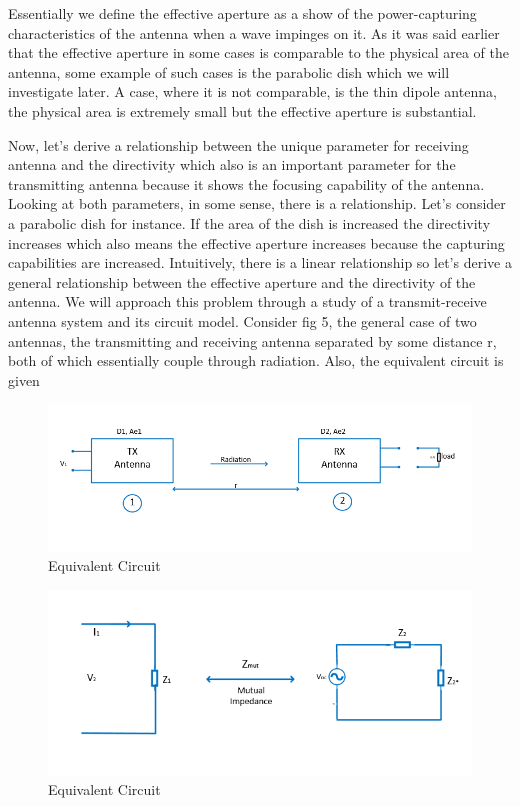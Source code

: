 Essentially we define the effective aperture as a show of the power-capturing characteristics of the antenna when a wave impinges on it. As it was said earlier that the effective aperture in some cases is comparable to the physical area of the antenna, some example of such cases is the parabolic dish which we will investigate later. A case, where it is not comparable, is the thin dipole antenna, the physical area is extremely small but the effective aperture is substantial.

Now, let's derive a relationship between the unique parameter for receiving antenna and the directivity which also is an important parameter for the transmitting antenna because it shows the focusing capability of the antenna. Looking at both parameters, in some sense, there is a relationship. Let's consider a parabolic dish for instance. If the area of the dish is increased the directivity increases which also means the effective aperture increases because the capturing capabilities are increased. Intuitively, there is a linear relationship so let's derive a general relationship between the effective aperture and the directivity of the antenna. We will approach this problem through a study of a transmit-receive antenna system and its circuit model. Consider fig 5, the general case of two antennas, the transmitting and receiving antenna separated by some distance r, both of which essentially couple through radiation. Also, the equivalent circuit is given
\begin{figure}[h]
\includegraphics[width=1\linewidth]{./graphics/fig52__5a}
\centering
\caption{Equivalent Circuit}
\label{fig5b}	
\end{figure}

\begin{figure}[h]
\includegraphics[width=1\linewidth]{./graphics/fig52_5b}
\centering
\caption{Equivalent Circuit}
\label{fig 1}	
\end{figure}


